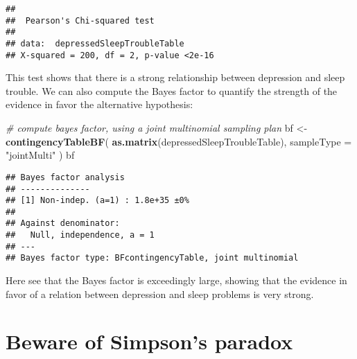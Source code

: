 \documentclass[]{book}
\newenvironment{Shaded}{\begin{snugshade}}{\end{snugshade}}
\newcommand{\KeywordTok}[1]{\textcolor[rgb]{0.13,0.29,0.53}{\textbf{#1}}}
\newcommand{\DataTypeTok}[1]{\textcolor[rgb]{0.13,0.29,0.53}{#1}}
\newcommand{\StringTok}[1]{\textcolor[rgb]{0.31,0.60,0.02}{#1}}
\newcommand{\CommentTok}[1]{\textcolor[rgb]{0.56,0.35,0.01}{\textit{#1}}}
\newcommand{\OperatorTok}[1]{\textcolor[rgb]{0.81,0.36,0.00}{\textbf{#1}}}
\newcommand{\NormalTok}[1]{#1}
\theoremstyle{definition}
\theoremstyle{definition}
\theoremstyle{definition}
\theoremstyle{remark}
\begin{document}
\begin{Shaded}
\end{Shaded}

\begin{verbatim}
## 
##  Pearson's Chi-squared test
## 
## data:  depressedSleepTroubleTable
## X-squared = 200, df = 2, p-value <2e-16
\end{verbatim}

This test shows that there is a strong relationship between depression
and sleep trouble. We can also compute the Bayes factor to quantify the
strength of the evidence in favor the alternative hypothesis:

\begin{Shaded}
\begin{Highlighting}[]
\CommentTok{# compute bayes factor, using a joint multinomial sampling plan}
\NormalTok{bf <-}
\StringTok{  }\KeywordTok{contingencyTableBF}\NormalTok{(}
    \KeywordTok{as.matrix}\NormalTok{(depressedSleepTroubleTable),}
    \DataTypeTok{sampleType =} \StringTok{"jointMulti"}
\NormalTok{  )}
\NormalTok{bf}
\end{Highlighting}
\end{Shaded}

\begin{verbatim}
## Bayes factor analysis
## --------------
## [1] Non-indep. (a=1) : 1.8e+35 ±0%
## 
## Against denominator:
##   Null, independence, a = 1 
## ---
## Bayes factor type: BFcontingencyTable, joint multinomial
\end{verbatim}

Here see that the Bayes factor is exceedingly large, showing that the
evidence in favor of a relation between depression and sleep problems is
very strong.

\section{Beware of Simpson's paradox}\label{beware-of-simpsons-paradox}
\end{document}
